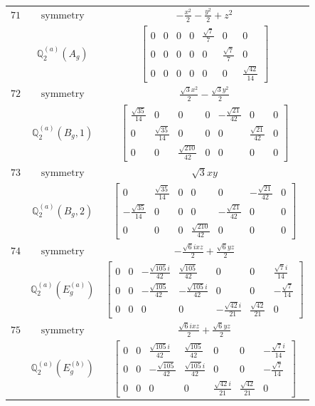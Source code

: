 \documentclass[fleqn,8pt,landscape]{jsarticle}
\begin{document}
\begin{longtable}{ccc}
$ 71 $ & $ \text{symmetry} $ & $ - \frac{x^{2}}{2} - \frac{y^{2}}{2} + z^{2} $ \\
$  $ & $ \mathbb{Q}_{2}^{(a)}(A_{g}) $ & $ \begin{bmatrix} 0 & 0 & 0 & 0 & \frac{\sqrt{7}}{7} & 0 & 0 \\ 0 & 0 & 0 & 0 & 0 & \frac{\sqrt{7}}{7} & 0 \\ 0 & 0 & 0 & 0 & 0 & 0 & \frac{\sqrt{42}}{14} \end{bmatrix} $ \\ \hline
$ 72 $ & $ \text{symmetry} $ & $ \frac{\sqrt{3} x^{2}}{2} - \frac{\sqrt{3} y^{2}}{2} $ \\
$  $ & $ \mathbb{Q}_{2}^{(a)}(B_{g},1) $ & $ \begin{bmatrix} \frac{\sqrt{35}}{14} & 0 & 0 & 0 & - \frac{\sqrt{21}}{42} & 0 & 0 \\ 0 & \frac{\sqrt{35}}{14} & 0 & 0 & 0 & \frac{\sqrt{21}}{42} & 0 \\ 0 & 0 & \frac{\sqrt{210}}{42} & 0 & 0 & 0 & 0 \end{bmatrix} $ \\ \hline
$ 73 $ & $ \text{symmetry} $ & $ \sqrt{3} x y $ \\
$  $ & $ \mathbb{Q}_{2}^{(a)}(B_{g},2) $ & $ \begin{bmatrix} 0 & \frac{\sqrt{35}}{14} & 0 & 0 & 0 & - \frac{\sqrt{21}}{42} & 0 \\ - \frac{\sqrt{35}}{14} & 0 & 0 & 0 & - \frac{\sqrt{21}}{42} & 0 & 0 \\ 0 & 0 & 0 & \frac{\sqrt{210}}{42} & 0 & 0 & 0 \end{bmatrix} $ \\ \hline
$ 74 $ & $ \text{symmetry} $ & $ - \frac{\sqrt{6} i x z}{2} + \frac{\sqrt{6} y z}{2} $ \\
$  $ & $ \mathbb{Q}_{2}^{(a)}(E_{g}^{(a)}) $ & $ \begin{bmatrix} 0 & 0 & - \frac{\sqrt{105} i}{42} & \frac{\sqrt{105}}{42} & 0 & 0 & \frac{\sqrt{7} i}{14} \\ 0 & 0 & - \frac{\sqrt{105}}{42} & - \frac{\sqrt{105} i}{42} & 0 & 0 & - \frac{\sqrt{7}}{14} \\ 0 & 0 & 0 & 0 & - \frac{\sqrt{42} i}{21} & \frac{\sqrt{42}}{21} & 0 \end{bmatrix} $ \\ \hline
$ 75 $ & $ \text{symmetry} $ & $ \frac{\sqrt{6} i x z}{2} + \frac{\sqrt{6} y z}{2} $ \\
$  $ & $ \mathbb{Q}_{2}^{(a)}(E_{g}^{(b)}) $ & $ \begin{bmatrix} 0 & 0 & \frac{\sqrt{105} i}{42} & \frac{\sqrt{105}}{42} & 0 & 0 & - \frac{\sqrt{7} i}{14} \\ 0 & 0 & - \frac{\sqrt{105}}{42} & \frac{\sqrt{105} i}{42} & 0 & 0 & - \frac{\sqrt{7}}{14} \\ 0 & 0 & 0 & 0 & \frac{\sqrt{42} i}{21} & \frac{\sqrt{42}}{21} & 0 \end{bmatrix} $ \\ \hline

\end{longtable}
\end{document}
